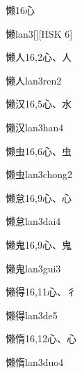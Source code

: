 \begin{Entry}{懒}{16}{⼼}
  \begin{Phonetics}{懒}{lan3}[][HSK 6]
  \end{Phonetics}
\end{Entry}

\begin{Entry}{懒人}{16,2}{⼼、⼈}
  \begin{Phonetics}{懒人}{lan3ren2}
  \end{Phonetics}
\end{Entry}

\begin{Entry}{懒汉}{16,5}{⼼、⽔}
  \begin{Phonetics}{懒汉}{lan3han4}
  \end{Phonetics}
\end{Entry}

\begin{Entry}{懒虫}{16,6}{⼼、⾍}
  \begin{Phonetics}{懒虫}{lan3chong2}
  \end{Phonetics}
\end{Entry}

\begin{Entry}{懒怠}{16,9}{⼼、⼼}
  \begin{Phonetics}{懒怠}{lan3dai4}
  \end{Phonetics}
\end{Entry}

\begin{Entry}{懒鬼}{16,9}{⼼、⿁}
  \begin{Phonetics}{懒鬼}{lan3gui3}
  \end{Phonetics}
\end{Entry}

\begin{Entry}{懒得}{16,11}{⼼、⼻}
  \begin{Phonetics}{懒得}{lan3de5}
  \end{Phonetics}
\end{Entry}

\begin{Entry}{懒惰}{16,12}{⼼、⼼}
  \begin{Phonetics}{懒惰}{lan3duo4}
  \end{Phonetics}
\end{Entry}

